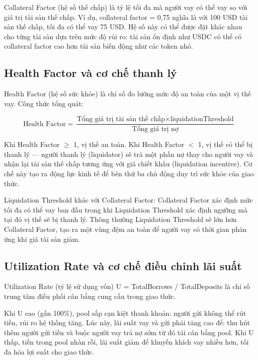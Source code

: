 \documentclass[../DoAn.tex]{subfiles}
\begin{document}
Collateral Factor (hệ số thế chấp) là tỷ lệ tối đa mà người vay có thể vay so với giá trị tài sản thế chấp. Ví dụ, collateral factor = 0,75 nghĩa là với 100 USD tài sản thế chấp, tối đa có thể vay 75 USD. Hệ số này có thể được đặt khác nhau cho từng tài sản dựa trên mức độ rủi ro: tài sản ổn định như USDC có thể có collateral factor cao hơn tài sản biến động như các token nhỏ.

\subsection{Health Factor và cơ chế thanh lý}


Health Factor (hệ số sức khỏe) là chỉ số đo lường mức độ an toàn của một vị thế vay. Công thức tổng quát:

\begin{equation}
\text{Health Factor} = \frac{\text{Tổng giá trị tài sản thế chấp} \times \text{liquidationThreshold}}{\text{Tổng giá trị nợ}}
\label{eq:health_factor}
\end{equation}


Khi Health Factor $\geq$ 1, vị thế an toàn. Khi Health Factor $<$ 1, vị thế có thể bị thanh lý --- người thanh lý (liquidator) sẽ trả một phần nợ thay cho người vay và nhận lại tài sản thế chấp tương ứng với giá chiết khấu (liquidation incentive). Cơ chế này tạo ra động lực kinh tế để bên thứ ba chủ động duy trì sức khỏe của giao thức.

Liquidation Threshold khác với Collateral Factor: Collateral Factor xác định mức tối đa có thể vay ban đầu trong khi Liquidation Threshold xác định ngưỡng mà tại đó vị thế sẽ bị thanh lý. Thông thường Liquidation Threshold sẽ lớn hơn Collateral Factor, tạo ra một vùng đệm an toàn để người vay có thời gian phản ứng khi giá tài sản giảm.

\subsection{Utilization Rate và cơ chế điều chỉnh lãi suất}


Utilization Rate (tỷ lệ sử dụng vốn) U = TotalBorrows / TotalDeposits là chỉ số trung tâm điều phối cân bằng cung cầu trong giao thức.

Khi U cao (gần 100\%), pool sắp cạn kiệt thanh khoản: người gửi không thể rút tiền, rủi ro hệ thống tăng. Lúc này, lãi suất vay và gửi phải tăng cao để: thu hút thêm người gửi tiền và buộc người vay trả nợ sớm từ đó tái cân bằng pool. Khi U thấp, tiền trong pool nhàn rỗi, lãi suất giảm để khuyến khích vay nhiều hơn, tối đa hóa lợi suất cho giao thức.
\end{document}
